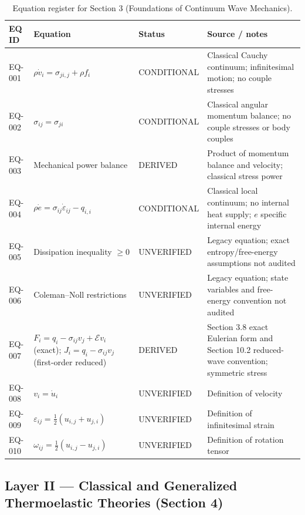\begin{table}[htbp]
\centering
\small
\setlength{\tabcolsep}{3pt}
\caption{Equation register for Section 3 (Foundations of Continuum Wave Mechanics).}
\label{tab:appA-sec3}
\begin{tabularx}{\textwidth}{@{}p{1.6cm}Y p{2.8cm}Y@{}}
\toprule
\textbf{EQ ID} & \textbf{Equation} & \textbf{Status} & \textbf{Source / notes} \\
\midrule
EQ-001 & $\rho \dot{v}_i = \sigma_{ji,j} + \rho f_i$ & CONDITIONAL & Classical Cauchy continuum; infinitesimal motion; no couple stresses \\
EQ-002 & $\sigma_{ij} = \sigma_{ji}$ & CONDITIONAL & Classical angular momentum balance; no couple stresses or body couples \\
EQ-003 & Mechanical power balance & DERIVED & Product of momentum balance and velocity; classical stress power \\
EQ-004 & $\rho \dot{e} = \sigma_{ij}\dot{\varepsilon}_{ij} - q_{i,i}$ & CONDITIONAL & Classical local continuum; no internal heat supply; $e$ specific internal energy \\
EQ-005 & Dissipation inequality $\geq 0$ & UNVERIFIED & Legacy equation; exact entropy/free-energy assumptions not audited \\
EQ-006 & Coleman--Noll restrictions & UNVERIFIED & Legacy equation; state variables and free-energy convention not audited \\
EQ-007 & $F_i=q_i-\sigma_{ij}v_j+\mathcal{E}v_i$ (exact); $J_i=q_i-\sigma_{ij}v_j$ (first-order reduced) & DERIVED & Section 3.8 exact Eulerian form and Section 10.2 reduced-wave convention; symmetric stress \\
EQ-008 & $v_i = \dot{u}_i$ & UNVERIFIED & Definition of velocity \\
EQ-009 & $\varepsilon_{ij} = \tfrac{1}{2}(u_{i,j} + u_{j,i})$ & UNVERIFIED & Definition of infinitesimal strain \\
EQ-010 & $\omega_{ij} = \tfrac{1}{2}(u_{i,j} - u_{j,i})$ & UNVERIFIED & Definition of rotation tensor \\
\bottomrule
\end{tabularx}
\end{table}

\subsection{Layer II — Classical and Generalized Thermoelastic Theories (Section 4)}


